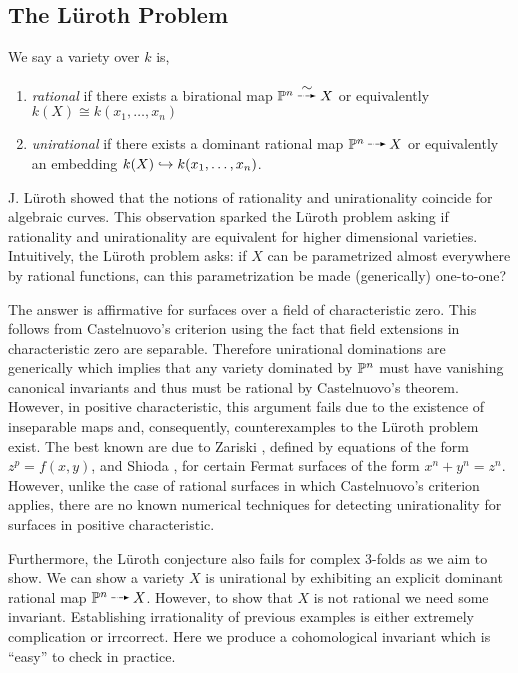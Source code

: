\documentclass[12pt]{article}
\begin{document}
\subsection*{The L\"{u}roth Problem}

\begin{defn}
We say a variety over $k$ is,
\begin{enumerate}
\item \textit{rational} if there exists a birational map $\P^n \birat X$ or equivalently $k(X) \cong k(x_1, \dots, x_n)$
\item \textit{unirational} if there exists a dominant rational map $\P^n \rat X$ or equivalently an embedding $k(X) \embed k(x_1, \dots, x_n)$.
\end{enumerate}
\end{defn}

J. L\"{u}roth showed \cite{Luroth} that the notions of rationality and unirationality coincide for algebraic curves. This observation sparked the L\"{u}roth problem asking if rationality and unirationality are equivalent for higher dimensional varieties. Intuitively, the L\"{u}roth problem asks: if $X$ can be parametrized almost everywhere by rational functions, can this parametrization be made (generically) one-to-one? 
\par
The answer is affirmative for surfaces over a field of characteristic zero. This follows from Castelnuovo's criterion using the fact that field extensions in characteristic zero are separable. Therefore unirational dominations are generically \etale which implies that any variety dominated by $\P^n$ must have vanishing canonical invariants and thus must be rational by Castelnuovo's theorem. However, in positive characteristic, this argument fails due to the existence of inseparable maps and, consequently, counterexamples to the L\"{u}roth problem exist. The best known are due to Zariski \cite{zariski1958}, defined  by equations of the form $z^p = f(x, y)$, and Shioda \cite{shioda1974}, for certain Fermat surfaces of the form $x^n + y^n = z^n$. However, unlike the case of rational surfaces in which Castelnuovo's criterion applies, there are no known numerical techniques for detecting unirationality for surfaces in positive characteristic.
\par
Furthermore, the L\"{u}roth conjecture also fails for complex 3-folds as we aim to show. We can show a variety $X$ is unirational by exhibiting an explicit dominant rational map $\P^n \rat X$. However, to show that $X$ is not rational we need some invariant. Establishing irrationality of previous examples is either extremely complication or irrcorrect. Here we produce a cohomological invariant which is ``easy'' to check in practice.
\end{document}
